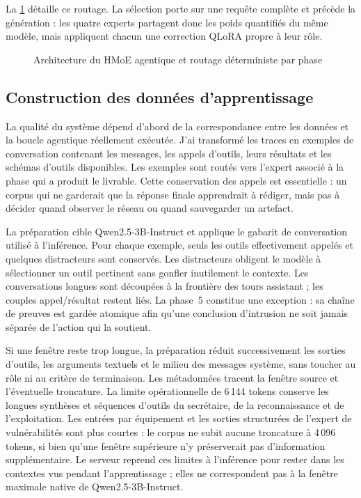 La \cref{fig:architecture-hmoe} détaille ce routage. La sélection porte sur une
requête complète et précède la génération : les quatre experts partagent donc
les poids quantifiés du même modèle, mais appliquent chacun une correction
QLoRA propre à leur rôle.

\begin{figure}[htbp]
  \centering
  \resizebox{0.98\textwidth}{!}{}
  \caption{Architecture du HMoE agentique et routage déterministe par phase}
  \label{fig:architecture-hmoe}
\end{figure}

\subsection{Construction des données d'apprentissage}

La qualité du système dépend d'abord de la correspondance entre les données et
la boucle agentique réellement exécutée. J'ai transformé les traces en exemples
de conversation contenant les messages, les appels d'outils, leurs résultats et
les schémas d'outils disponibles. Les exemples sont routés vers l'expert associé
à la phase qui a produit le livrable. Cette conservation des appels est
essentielle : un corpus qui ne garderait que la réponse finale apprendrait à
rédiger, mais pas à décider quand observer le réseau ou quand sauvegarder un
artefact.

La préparation cible Qwen2.5-3B-Instruct et applique le gabarit de conversation
utilisé à l'inférence. Pour chaque exemple, seuls les outils effectivement
appelés et quelques distracteurs sont conservés. Les distracteurs obligent le
modèle à sélectionner un outil pertinent sans gonfler inutilement le contexte.
Les conversations longues sont découpées à la frontière des tours assistant ;
les couples appel/résultat restent liés. La phase~5 constitue une exception : sa
chaîne de preuves est gardée atomique afin qu'une conclusion d'intrusion ne soit
jamais séparée de l'action qui la soutient.

Si une fenêtre reste trop longue, la préparation réduit successivement les
sorties d'outils, les arguments textuels et le milieu des messages système, sans
toucher au rôle ni au critère de terminaison. Les métadonnées tracent la fenêtre
source et l'éventuelle troncature. La limite opérationnelle de 6\,144 tokens
conserve les longues synthèses et séquences d'outils du secrétaire, de la
reconnaissance et de l'exploitation. Les entrées par équipement et les sorties
structurées de l'expert de vulnérabilités sont plus courtes : le corpus ne subit
aucune troncature à 4\,096 tokens, si bien qu'une fenêtre supérieure n'y
préserverait pas d'information supplémentaire. Le serveur reprend ces limites à
l'inférence pour rester dans les contextes vus pendant l'apprentissage ; elles
ne correspondent pas à la fenêtre maximale native de Qwen2.5-3B-Instruct.

